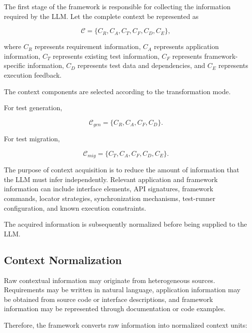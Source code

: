 \documentclass[pdflatex,sn-mathphys-num]{sn-jnl}
\begin{document}
The first stage of the framework is responsible for collecting the
information required by the LLM. Let the complete context be represented as

\begin{equation}
    \mathcal{C}
    =
    \{
    C_R,C_A,C_T,C_F,C_D,C_E
    \},
\label{eq:method-context}
\end{equation}

where $C_R$ represents requirement information, $C_A$ represents application
information, $C_T$ represents existing test information, $C_F$ represents
framework-specific information, $C_D$ represents test data and dependencies,
and $C_E$ represents execution feedback.

The context components are selected according to the transformation mode.

For test generation,

\begin{equation}
    \mathcal{C}_{gen}
    =
    \{
    C_R,C_A,C_F,C_D
    \}.
\label{eq:generation-context}
\end{equation}

For test migration,

\begin{equation}
    \mathcal{C}_{mig}
    =
    \{
    C_T,C_A,C_F,C_D,C_E
    \}.
\label{eq:migration-context}
\end{equation}

The purpose of context acquisition is to reduce the amount of information
that the LLM must infer independently. Relevant application and framework
information can include interface elements, API signatures, framework
commands, locator strategies, synchronization mechanisms, test-runner
configuration, and known execution constraints.

The acquired information is subsequently normalized before being supplied
to the LLM.

\subsection{Context Normalization}
\label{subsec:context-normalization}

Raw contextual information may originate from heterogeneous sources.
Requirements may be written in natural language, application information may
be obtained from source code or interface descriptions, and framework
information may be represented through documentation or code examples.

Therefore, the framework converts raw information into normalized context
units:
\end{document}
